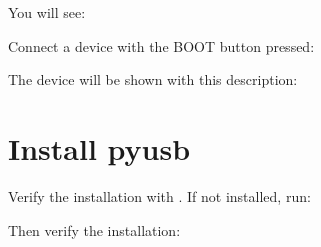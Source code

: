 \documentclass[letterpaper,10pt,english]{sphinxmanual}
\begin{document}
\sphinxAtStartPar
You will see:

\begin{sphinxVerbatim}[commandchars=\\\{\}]
   
           
         
         
           
       
\end{sphinxVerbatim}

\sphinxAtStartPar
Connect a device with the BOOT button pressed:

\begin{sphinxVerbatim}[commandchars=\\\{\}]
\end{sphinxVerbatim}

\sphinxAtStartPar
The device will be shown with this description:

\begin{sphinxVerbatim}[commandchars=\\\{\}]
\end{sphinxVerbatim}


\section{Install pyusb}
\label{\detokenize{install_linux:install-pyusb}}
\sphinxAtStartPar
Verify the installation with . If not installed, run:

\begin{sphinxVerbatim}[commandchars=\\\{\}]
   
\end{sphinxVerbatim}

\sphinxAtStartPar
Then verify the installation:

\begin{sphinxVerbatim}[commandchars=\\\{\}]
    
\end{sphinxVerbatim}
\end{document}
